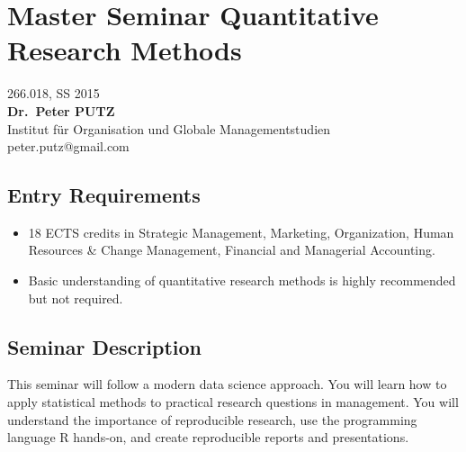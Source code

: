 \documentclass[]{article}
\date{}
\begin{document}

\centering

\section{Master Seminar Quantitative Research
Methods}\label{master-seminar-quantitative-research-methods}

266.018, SS 2015\\\textbf{Dr.~Peter PUTZ}\\Institut für Organisation und
Globale Managementstudien\\peter.putz@gmail.com

\raggedright

\subsection{Entry Requirements}\label{entry-requirements}

\begin{itemize}
\itemsep1pt\parskip0pt
\item
  18 ECTS credits in Strategic Management, Marketing, Organization,
  Human Resources \& Change Management, Financial and Managerial
  Accounting.
\item
  Basic understanding of quantitative research methods is highly
  recommended but not required.
\end{itemize}

\subsection{Seminar Description}\label{seminar-description}

This seminar will follow a modern data science approach. You will learn
how to apply statistical methods to practical research questions in
management. You will understand the importance of reproducible research,
use the programming language R hands-on, and create reproducible reports
and presentations.
\end{document}
